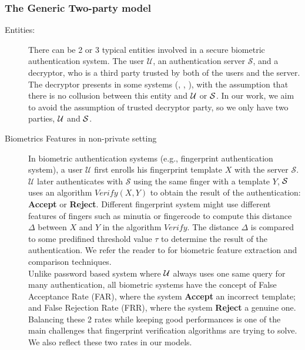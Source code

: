 \subsubsection{The Generic Two-party model}

\begin{description}
\item[Entities:] There can be 2 or 3 typical entities involved in a secure biometric authentication system. The user
  $\mathcal{U}$, an authentication server $\mathcal{S}$, and a decryptor, who is a third party trusted by both of the
  users and the server. The decryptor presents in some systems (\cite{mandal2015comprehensive},
  \cite{hirano2013cryptographically}, \cite{higo2015privacy}), with the assumption that there is no collusion between
  this entity and $\mathcal{U}$ or $\mathcal{S}$. In our work, we aim to avoid the assumption of trusted decryptor party, so we
  only have two parties, $\mathcal{U}$ and $\mathcal{S}$.
\item[Biometrics Features in non-private setting] In biometric authentication systems (e.g., fingerprint authentication
  system), a user $\mathcal{U}$ first
  enrolls his fingerprint template $X$ with the server $\mathcal{S}$. $\mathcal{U}$ later authenticates with
  $\mathcal{S}$ using the same finger with a template $Y$, $\mathcal{S}$ uses an algorithm $Verify(X,Y)$ to obtain the
  result of the authentication: \textbf{Accept} or \textbf{Reject}. Different fingerprint system might use different
  features of fingers such as minutia or fingercode to compute this distance $\Delta$ between $X$ and $Y$ in the
  algorithm $Verify$. The distance $\Delta$ is compared to some predifined threshold value $\tau$ to determine the
  result of the authentication. We refer the reader to \cite{jain2007handbook} for biometric feature extraction and
  comparison techniques.\\

  Unlike password based system where $\mathcal{U}$ always uses one same query for many authentication, all biometric systems
  have the concept of False Acceptance Rate (FAR), where the system \textbf{Accept} an incorrect template; and False
  Rejection Rate (FRR), where the system \textbf{Reject} a genuine one.  Balancing these 2 rates while keeping good
  performances is one of the main challenges that fingerprint verification algorithms \cite{FVConGoi2:online} are trying
  to solve. We also reflect these two rates in our models.


\end{description}
